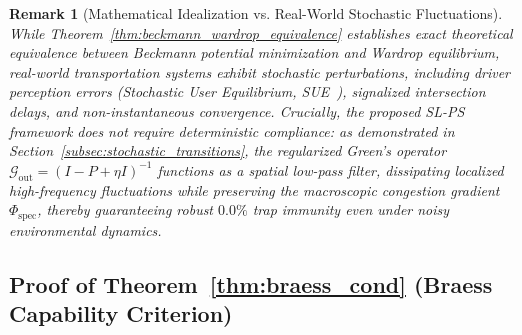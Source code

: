 \documentclass[11pt,a4paper]{article}
\newtheorem{remark}{Remark}
\begin{document}
\begin{remark}[Mathematical Idealization vs. Real-World Stochastic Fluctuations]
While Theorem~\ref{thm:beckmann_wardrop_equivalence} establishes exact theoretical equivalence between Beckmann potential minimization and Wardrop equilibrium, real-world transportation systems exhibit stochastic perturbations, including driver perception errors (Stochastic User Equilibrium, SUE~\cite{daganzo1977stochastic}), signalized intersection delays, and non-instantaneous convergence. Crucially, the proposed SL-PS framework does not require deterministic compliance: as demonstrated in Section~\ref{subsec:stochastic_transitions}, the regularized Green's operator $\mathcal{G}_{\text{out}} = (I - P + \eta I)^{-1}$ functions as a spatial low-pass filter, dissipating localized high-frequency fluctuations while preserving the macroscopic congestion gradient $\Phi_{\text{spec}}$, thereby guaranteeing robust $0.0\%$ trap immunity even under noisy environmental dynamics.
\end{remark}

\subsection{Proof of Theorem~\ref{thm:braess_cond} (Braess Capability Criterion)}
\label{subsec:proof_thm1}
\end{document}
